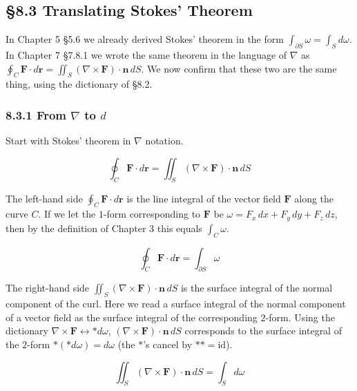 \documentclass[a4paper,12pt,openany]{book}
\begin{document}
\par\vspace{0.35em}\par

\hypertarget{translating-stokes-theorem}{%
\subsection{§8.3 Translating Stokes'
Theorem}\label{translating-stokes-theorem}}

In Chapter 5 §5.6 we already derived Stokes' theorem in the form
\(\int_{\partial S}\omega = \int_S d\omega\). In Chapter 7 §7.8.1 we
wrote the same theorem in the language of \(\nabla\) as
\(\oint_C \mathbf{F}\cdot d\mathbf{r} = \iint_S (\nabla\times\mathbf{F})\cdot\mathbf{n}\,dS\).
We now confirm that these two are the same thing, using the dictionary
of §8.2.

\hypertarget{from-nabla-to-d}{%
\subsubsection{\texorpdfstring{8.3.1 From \(\nabla\) to
\(d\)}{8.3.1 From \textbackslash nabla to d}}\label{from-nabla-to-d}}

Start with Stokes' theorem in \(\nabla\) notation.

\[\oint_C \mathbf{F} \cdot d\mathbf{r} = \iint_S (\nabla \times \mathbf{F}) \cdot \mathbf{n}\,dS\]

The left-hand side \(\oint_C \mathbf{F}\cdot d\mathbf{r}\) is the line
integral of the vector field \(\mathbf{F}\) along the curve \(C\). If we
let the \(1\)-form corresponding to \(\mathbf{F}\) be
\(\omega = F_x\,dx + F_y\,dy + F_z\,dz\), then by the definition of
Chapter 3 this equals \(\int_C \omega\).

\[\oint_C \mathbf{F} \cdot d\mathbf{r} = \int_{\partial S} \omega\]

The right-hand side
\(\iint_S (\nabla\times\mathbf{F})\cdot\mathbf{n}\,dS\) is the surface
integral of the normal component of the curl. Here we read a surface
integral of the normal component of a vector field as the surface
integral of the corresponding \(2\)-form. Using the dictionary
\(\nabla\times\mathbf{F} \leftrightarrow \ast d\omega\),
\((\nabla\times\mathbf{F})\cdot\mathbf{n}\,dS\) corresponds to the
surface integral of the \(2\)-form \(\ast(\ast d\omega) = d\omega\) (the
\(\ast\)'s cancel by \(\ast\ast = \mathrm{id}\)).

\[\iint_S (\nabla \times \mathbf{F}) \cdot \mathbf{n}\,dS = \int_S d\omega\]
\end{document}
